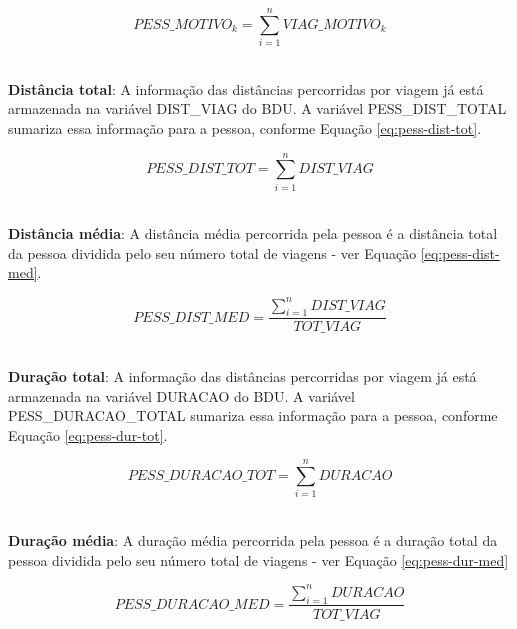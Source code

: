 \begin{compactitem}
\begin{equation}\label{eq:pess-motivo}
PESS\_MOTIVO_{k}=\displaystyle\sum_{i=1}^{n}VIAG\_MOTIVO_{k}
\end{equation}\\

\item \textbf{Distância total}: A informação das distâncias percorridas por viagem já está armazenada na variável DIST_VIAG do BDU. A variável PESS_DIST_TOTAL sumariza essa informação para a pessoa, conforme Equação \eqref{eq:pess-dist-tot}.

\begin{equation}\label{eq:pess-dist-tot}
PESS\_DIST\_TOT=\displaystyle\sum_{i=1}^{n}DIST\_VIAG
\end{equation}\\

\item \textbf{Distância média}: A distância média percorrida pela pessoa é a distância total da pessoa dividida pelo seu número total de viagens - ver Equação \eqref{eq:pess-dist-med}.

\begin{equation}\label{eq:pess-dist-med}
PESS\_DIST\_MED=\frac{\displaystyle\sum_{i=1}^{n}DIST\_VIAG}{TOT\_VIAG}
\end{equation}\\

\item \textbf{Duração total}: A informação das distâncias percorridas por viagem já está armazenada na variável DURACAO do BDU. A variável PESS_DURACAO_TOTAL sumariza essa informação para a pessoa, conforme Equação \eqref{eq:pess-dur-tot}.

\begin{equation}\label{eq:pess-dur-tot}
PESS\_DURACAO\_TOT=\displaystyle\sum_{i=1}^{n}DURACAO
\end{equation}\\

\item \textbf{Duração média}: A duração média percorrida pela pessoa é a duração total da pessoa dividida pelo seu número total de viagens - ver Equação \eqref{eq:pess-dur-med}

\begin{equation}\label{eq:pess-dur-med}
PESS\_DURACAO\_MED=\frac{\displaystyle\sum_{i=1}^{n}DURACAO}{TOT\_VIAG}
\end{equation}\\

\end{compactitem}

